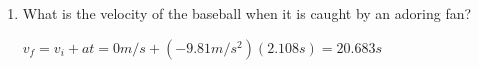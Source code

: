 \documentclass[letterpaper, 12pt]{article}
\begin{document}
\begin{enumerate}
\begin{enumerate}
		\vspace{0.25in}
		\item What is the velocity of the baseball when it is caught by an adoring fan?
		
			\color{red}
		\begin{center}
			 $  v_f = v_i + at = 0 m/s + (-9.81 m/s^2)(2.108s) = 20.683s
			$
		\end{center}
		\color{black}
		
		
	\end{enumerate}

\end{enumerate}
 
\end{document}
